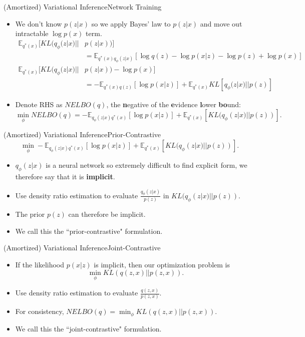 \documentclass{beamer}
\newcommand{\E}{\mathbb{E}}
\begin{document}
\begin{frame}{(Amortized) Variational Inference}{Network Training}
\begin{itemize}
\item We don't know $p(z|x)$ so we apply Bayes' law to $p(z|x)$ and move out intractable $\log p(x)$ term.
\small
\begin{align*}
\E_{q^*(x)}[KL(q_\phi(z|x)||&p(z|x))]\\
&=\mathbb{E}_{q^*(x)q_\phi(z|x)}[\log q(z)-\log p(x|z)-\log p(z)+\log p(x)]
\end{align*}
\begin{align*}
\E_{q^*(x)}[KL(q_\phi(z|x)||&p(z|x))-\log p(x)]\\
&=-\mathbb{E}_{q^*(x)q(z)}[\log p(x|z)]+\E_{q^*(x)}KL[q_\phi(z|x)||p(z)]
\end{align*}
\normalsize
\item Denote RHS as $NELBO(q)$, the \textbf{n}egative of the \textbf{e}vidence \textbf{l}ower \textbf{bo}und:
\[\min_\phi NELBO(q)=-\mathbb{E}_{q_\phi(z|x)q^*(x)}[\log p(x|z)]+\mathbb{E}_{q^*(x)}[KL(q_\phi(z|x)||p(z))].\]
\end{itemize}
\end{frame}
\begin{frame}{(Amortized) Variational Inference}{Prior-Contrastive}
\[\min_\phi -\mathbb{E}_{q_\phi(z|x)q^*(x)}[\log p(x|z)]+\mathbb{E}_{q^*(x)}[KL(q_\phi(z|x)||p(z))].\]
\begin{itemize}
\item $q_\phi(z|x)$ is a neural network so extremely difficult to find explicit form, we therefore say that it is \textbf{implicit}.
\item Use density ratio estimation to evaluate $\frac{q_\phi(z|x)}{p(z)}$ in $KL(q_\phi(z|x)||p(z))$.
\item The prior $p(z)$ can therefore be implicit.
\item We call this the ``prior-contrastive" formulation.
\end{itemize}
\end{frame}
\begin{frame}{(Amortized) Variational Inference}{Joint-Contrastive}
\begin{itemize}
\item If the likelihood $p(x|z)$ is implicit, then our optimization problem is \[\min_\phi KL(q(z,x)||p(z,x)).\]
\item Use density ratio estimation to evaluate $\frac{q(z,x)}{p(z,x)}$.
\item For consistency, $NELBO(q)=\min_\phi KL(q(z,x)||p(z,x))$.
\item We call this the ``joint-contrastive" formulation.
\end{itemize}
\end{frame}
\end{document}
